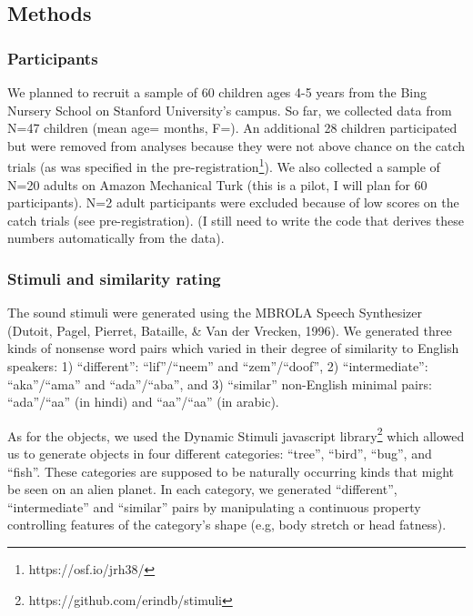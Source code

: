 \documentclass[10pt, letterpaper]{article}
\begin{document}
\subsection{Methods}\label{methods}

\subsubsection{Participants}\label{participants}

We planned to recruit a sample of 60 children ages 4-5 years from the
Bing Nursery School on Stanford University's campus. So far, we
collected data from N=47 children (mean age= months, F=). An additional
28 children participated but were removed from analyses because they
were not above chance on the catch trials (as was specified in the
pre-registration\footnote{https://osf.io/jrh38/}). We also collected a
sample of N=20 adults on Amazon Mechanical Turk (this is a pilot, I will
plan for 60 participants). N=2 adult participants were excluded because
of low scores on the catch trials (see pre-registration). (I still need
to write the code that derives these numbers automatically from the
data).

\subsubsection{Stimuli and similarity
rating}\label{stimuli-and-similarity-rating}

The sound stimuli were generated using the MBROLA Speech Synthesizer
(Dutoit, Pagel, Pierret, Bataille, \& Van der Vrecken, 1996). We
generated three kinds of nonsense word pairs which varied in their
degree of similarity to English speakers: 1) ``different'':
``lif''/``neem'' and ``zem''/``doof'', 2) ``intermediate'':
``aka''/``ama'' and ``ada''/``aba'', and 3) ``similar'' non-English
minimal pairs: ``ada''/``aa'' (in hindi) and
``aa''/``a\textipa{\textcrh}a'' (in arabic).

As for the objects, we used the Dynamic Stimuli javascript
library\footnote{https://github.com/erindb/stimuli} which allowed us to
generate objects in four different categories: ``tree'', ``bird'',
``bug'', and ``fish''. These categories are supposed to be naturally
occurring kinds that might be seen on an alien planet. In each category,
we generated ``different'', ``intermediate'' and ``similar'' pairs by
manipulating a continuous property controlling features of the
category's shape (e.g, body stretch or head fatness).
\end{document}
